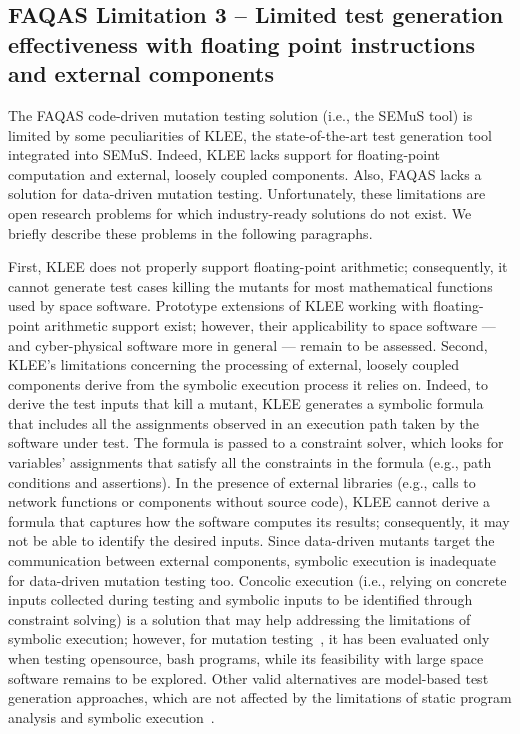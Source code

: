 \subsection{FAQAS Limitation 3 – Limited test generation effectiveness with floating point instructions and external components}

The FAQAS code-driven mutation testing solution (i.e., the SEMuS tool) is limited by some peculiarities of KLEE, the state-of-the-art test generation tool integrated into SEMuS. Indeed, KLEE lacks support for floating-point computation and external, loosely coupled components. Also, FAQAS lacks a solution for data-driven mutation testing. Unfortunately, these limitations are open research problems for which industry-ready solutions do not exist. We briefly describe these problems in the following paragraphs. 

First, KLEE does not properly support floating-point arithmetic; consequently, it cannot generate test cases killing the mutants for most mathematical functions used by space software. Prototype extensions of KLEE working with floating-point arithmetic support exist; however, their applicability to space software — and cyber-physical software more in general — remain to be assessed. Second, KLEE’s limitations concerning the processing of external, loosely coupled components derive from the symbolic execution process it relies on. Indeed, to derive the test inputs that kill a mutant, KLEE generates a symbolic formula that includes all the assignments observed in an execution path taken by the software under test. The formula is passed to a constraint solver, which looks for variables’ assignments that satisfy all the constraints in the formula (e.g., path conditions and assertions). In the presence of external libraries (e.g., calls to network functions or components without source code), KLEE cannot derive a formula that captures how the software computes its results; consequently, it may not be able to identify the desired inputs. Since data-driven mutants target the communication between external components, symbolic execution is inadequate for data-driven mutation testing too. Concolic execution (i.e., relying on concrete inputs collected during testing and symbolic inputs to be identified through constraint solving) is a solution that may help addressing the limitations of symbolic execution; however, for mutation testing~\cite{chekam2021killing}, it has been evaluated only when testing opensource, bash programs, while its feasibility with large space software remains to be explored. Other valid alternatives are model-based test generation approaches, which are not affected by the limitations of static program analysis and symbolic execution~\cite{di2017augmenting}.

